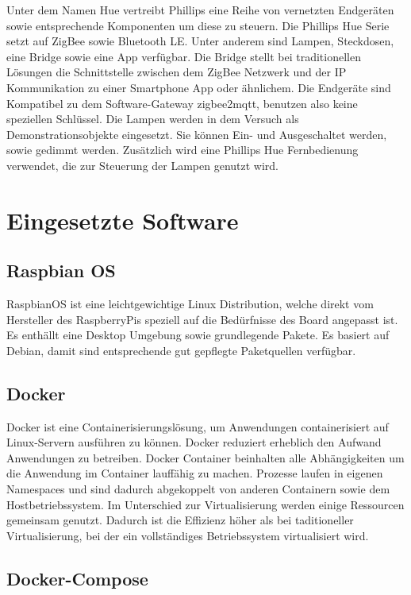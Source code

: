 Unter dem Namen \grqq Hue\grqq{} vertreibt Phillips eine Reihe von vernetzten Endgeräten sowie entsprechende Komponenten um diese zu steuern.
Die Phillips Hue Serie setzt auf ZigBee sowie Bluetooth LE. Unter anderem sind Lampen, Steckdosen, eine Bridge sowie eine App verfügbar.
Die Bridge stellt bei traditionellen Lösungen die Schnittstelle zwischen dem ZigBee Netzwerk und der IP Kommunikation zu einer Smartphone
App oder ähnlichem. Die Endgeräte sind Kompatibel zu dem Software-Gateway zigbee2mqtt, benutzen also keine speziellen Schlüssel.
Die Lampen werden in dem Versuch als Demonstrationsobjekte eingesetzt. Sie können Ein- und Ausgeschaltet werden, sowie gedimmt werden. Zusätzlich wird eine
Phillips Hue Fernbedienung verwendet, die zur Steuerung der Lampen genutzt wird.

\section{Eingesetzte Software}

\subsection{Raspbian OS}

RaspbianOS ist eine leichtgewichtige Linux Distribution, welche direkt vom Hersteller des RaspberryPis speziell auf die Bedürfnisse des Board angepasst ist. Es enthällt eine
Desktop Umgebung sowie grundlegende Pakete. Es basiert auf Debian, damit sind entsprechende gut gepflegte Paketquellen verfügbar. 

\subsection{Docker}

Docker ist eine Containerisierungslösung, um Anwendungen containerisiert auf Linux-Servern ausführen zu können. Docker reduziert erheblich den Aufwand 
Anwendungen zu betreiben. Docker Container beinhalten alle Abhängigkeiten um die Anwendung im Container lauffähig zu machen.
Prozesse laufen in eigenen Namespaces und sind dadurch abgekoppelt von anderen Containern sowie dem Hostbetriebssystem. Im Unterschied zur Virtualisierung werden
einige Ressourcen gemeinsam genutzt. Dadurch ist die Effizienz höher als bei taditioneller Virtualisierung, bei der ein vollständiges Betriebssystem virtualisiert wird.

\subsection{Docker-Compose}

